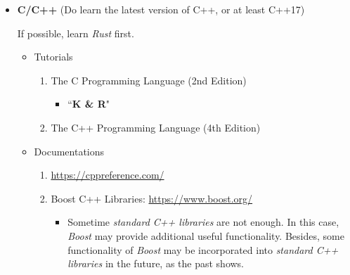 \documentclass{article}
\begin{document}
\begin{itemize}
    \item \textbf{C/C++} (Do learn the latest version of C++, or at least C++17)
    
    If possible, learn \emph{Rust} first.
    
    \begin{itemize}
        \item Tutorials
        \begin{enumerate}
            \item The C Programming Language (2nd Edition) \cite{ritchie1988c}
            \begin{itemize}
                \item ``\textbf{K \& R}"
            \end{itemize}
            \item The C++ Programming Language (4th Edition) \cite{stroustrup2013c++}
        \end{enumerate}
        \item Documentations
        \begin{enumerate}
            \item \href{https://cppreference.com/}{https://cppreference.com/}
            \item Boost C++ Libraries:
            \href{https://www.boost.org/}{https://www.boost.org/}
        \begin{itemize}
            \item Sometime \emph{standard C++ libraries} are not enough.
            In this case, \emph{Boost} may provide additional useful functionality.
            Besides, some functionality of \emph{Boost} may be incorporated into \emph{standard C++ libraries} in the future, as the past shows.
        \end{itemize}
        \end{enumerate}


\end{itemize}
\end{itemize}
\end{document}

